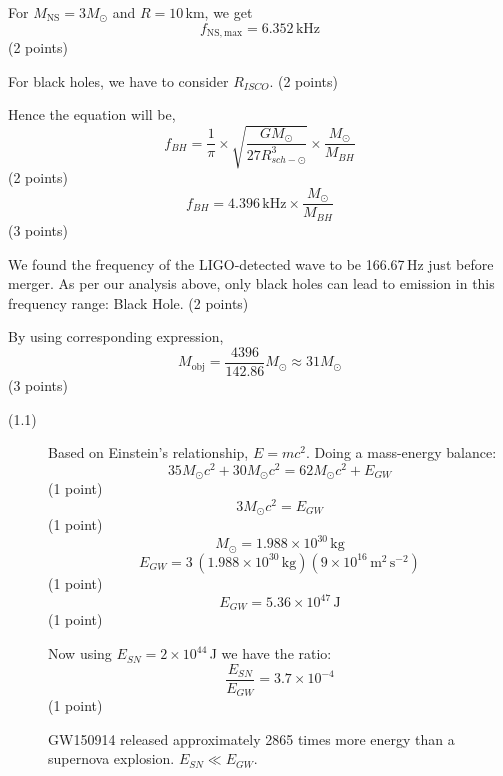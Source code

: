 \begin{description}
  For $M_{\mathrm{NS}} = 3M_\odot$ and $R = 10$\,km, we get
  \[ f_{\mathrm{NS,max}} = 6.352\,\mathrm{kHz} \]
  \hfill(2 points)

\item[(T11.6)] For black holes, we have to consider $R_{ISCO}$.
  \hfill(2 points)

  Hence the equation will be,
  \[ f_{BH} = \frac{1}{\pi} \times
     \sqrt{\frac{G M_\odot}{27 R_{sch-\odot}^3}} \times
     \frac{M_\odot}{M_{BH}} \]
  \hfill(2 points)
  \[ f_{BH} = 4.396\,\mathrm{kHz} \times \frac{M_\odot}{M_{BH}} \]
  \hfill(3 points)

\item[(T11.7)] We found the frequency of the LIGO-detected wave to be
  166.67\,Hz just before merger.
  As per our analysis above, only black holes can lead to emission in this
  frequency range: Black Hole. \hfill(2 points)

  By using corresponding expression,
  \[ M_{\mathrm{obj}} = \frac{4396}{142.86} M_\odot \approx 31 M_\odot \]
  \hfill(3 points)
\end{description}

\begin{description}
\item[(1.1)] Based on Einstein's relationship, $E = mc^2$. Doing a mass-energy
  balance:
  \[ 35 M_\odot c^2 + 30 M_\odot c^2 = 62 M_\odot c^2 + E_{GW} \]
  \hfill(1 point)
  \[ 3 M_\odot c^2 = E_{GW} \]
  \hfill(1 point)
  \[ M_\odot = 1.988 \times 10^{30}\,\mathrm{kg} \]
  \[ E_{GW} = 3\,(1.988 \times 10^{30}\,\mathrm{kg})
     (9 \times 10^{16}\,\mathrm{m^2\,s^{-2}}) \]
  \hfill(1 point)
  \[ E_{GW} = 5.36 \times 10^{47}\,\mathrm{J} \]
  \hfill(1 point)

  Now using $E_{SN} = 2 \times 10^{44}$\,J we have the ratio:
  \[ \frac{E_{SN}}{E_{GW}} = 3.7 \times 10^{-4} \]
  \hfill(1 point)

  GW150914 released approximately 2865 times more energy than a supernova
  explosion. $E_{SN} \ll E_{GW}$.
\end{description}

